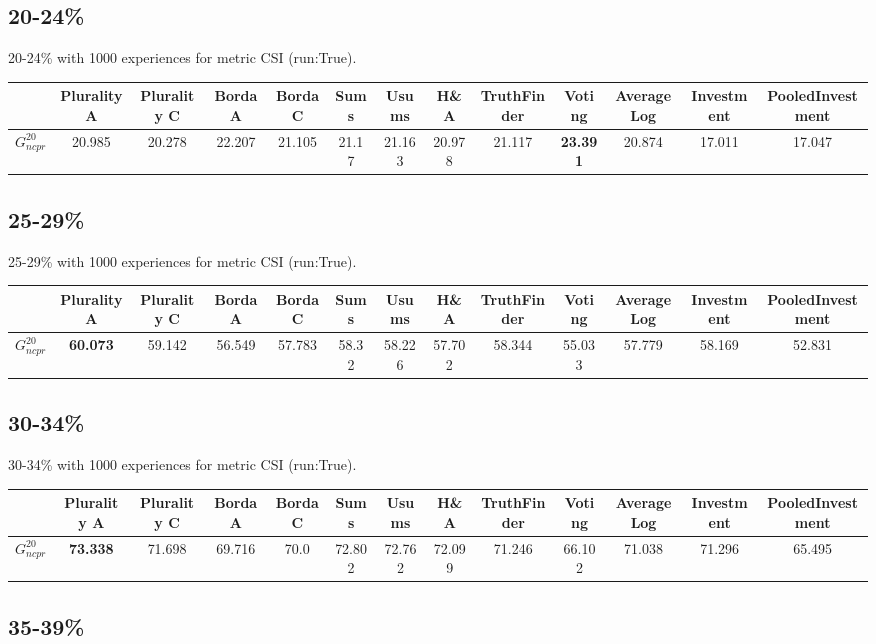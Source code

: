 \documentclass{article}
\newcommand{\graph}[2]{$G_{#1}^{#2}$}
\begin{document}
\subsection{20-24\%}

20-24\% with 1000 experiences for metric CSI (run:True).

\noindent\begin{tabular}{|l|c|c|c|c|c|c|c|c|c|c|c|c|}
\hline
& Plurality A& Plurality C& Borda A& Borda C& Sums& Usums& H\&A& TruthFinder& Voting& AverageLog& Investment& PooledInvestment\\
\hline
\graph{ncpr}{20} &20.985&20.278&22.207&21.105&21.17&21.163&20.978&21.117&\textbf{23.391}&20.874&17.011&17.047\\
\hline
\end{tabular}
\newpage

\subsection{25-29\%}

25-29\% with 1000 experiences for metric CSI (run:True).

\noindent\begin{tabular}{|l|c|c|c|c|c|c|c|c|c|c|c|c|}
\hline
& Plurality A& Plurality C& Borda A& Borda C& Sums& Usums& H\&A& TruthFinder& Voting& AverageLog& Investment& PooledInvestment\\
\hline
\graph{ncpr}{20} &\textbf{60.073}&59.142&56.549&57.783&58.32&58.226&57.702&58.344&55.033&57.779&58.169&52.831\\
\hline
\end{tabular}
\newpage

\subsection{30-34\%}

30-34\% with 1000 experiences for metric CSI (run:True).

\noindent\begin{tabular}{|l|c|c|c|c|c|c|c|c|c|c|c|c|}
\hline
& Plurality A& Plurality C& Borda A& Borda C& Sums& Usums& H\&A& TruthFinder& Voting& AverageLog& Investment& PooledInvestment\\
\hline
\graph{ncpr}{20} &\textbf{73.338}&71.698&69.716&70.0&72.802&72.762&72.099&71.246&66.102&71.038&71.296&65.495\\
\hline
\end{tabular}
\newpage

\subsection{35-39\%}
\end{document}
